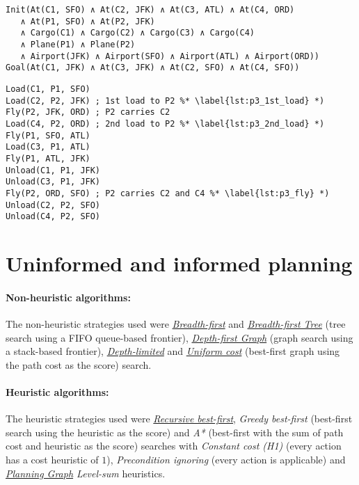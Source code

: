 \documentclass[12pt, a4paper, oneside]{article}
\begin{document}
\begin{lstlisting}[caption=Problem 3 initial state and goal,label=lst:problem3]
Init(At(C1, SFO) ∧ At(C2, JFK) ∧ At(C3, ATL) ∧ At(C4, ORD) 
   ∧ At(P1, SFO) ∧ At(P2, JFK) 
   ∧ Cargo(C1) ∧ Cargo(C2) ∧ Cargo(C3) ∧ Cargo(C4)
   ∧ Plane(P1) ∧ Plane(P2)
   ∧ Airport(JFK) ∧ Airport(SFO) ∧ Airport(ATL) ∧ Airport(ORD))
Goal(At(C1, JFK) ∧ At(C3, JFK) ∧ At(C2, SFO) ∧ At(C4, SFO))
\end{lstlisting}

\begin{lstlisting}[caption=Problem 3 optimal plan,label=lst:problem3_plan]
Load(C1, P1, SFO)
Load(C2, P2, JFK) ; 1st load to P2 %* \label{lst:p3_1st_load} *)
Fly(P2, JFK, ORD) ; P2 carries C2
Load(C4, P2, ORD) ; 2nd load to P2 %* \label{lst:p3_2nd_load} *)
Fly(P1, SFO, ATL)
Load(C3, P1, ATL)
Fly(P1, ATL, JFK)
Unload(C1, P1, JFK)
Unload(C3, P1, JFK)
Fly(P2, ORD, SFO) ; P2 carries C2 and C4 %* \label{lst:p3_fly} *)
Unload(C2, P2, SFO)
Unload(C4, P2, SFO)
\end{lstlisting}

\section{Uninformed and informed planning}

\paragraph{Non-heuristic algorithms:} The non-heuristic strategies used
were \href{https://github.com/sunsided/aima-pseudocode/blob/master/md/Breadth-First-Search.md}{\textit{Breadth-first}} and \href{https://github.com/sunsided/aima-pseudocode/blob/master/md/Tree-Search-and-Graph-Search.md}{\textit{Breadth-first Tree}} (tree search using a FIFO queue-based frontier),
\href{https://github.com/sunsided/aima-pseudocode/blob/master/md/Tree-Search-and-Graph-Search.md}{\textit{Depth-first Graph}} (graph search using a stack-based frontier), \href{https://github.com/sunsided/aima-pseudocode/blob/master/md/Depth-Limited-Search.md}{\textit{Depth-limited}} and \href{https://github.com/sunsided/aima-pseudocode/blob/master/md/Uniform-Cost-Search.md}{\textit{Uniform cost}} (best-first graph using the path cost as the score) search.

\paragraph{Heuristic algorithms:} The heuristic strategies used
were \href{https://github.com/sunsided/aima-pseudocode/blob/master/md/Recursive-Best-First-Search.md}{\textit{Recursive best-first}}, \textit{Greedy best-first} (best-first search using the heuristic as the score) and \textit{A*} (best-first with the sum of path cost and heuristic as the score) searches with 
\textit{Constant cost (H1)} (every action has a cost heuristic of $1$), \textit{Precondition ignoring} (every action is applicable) and \textit{\href{https://github.com/sunsided/aima-pseudocode/blob/master/md/GraphPlan.md}{Planning Graph} Level-sum} heuristics.
\end{document}

